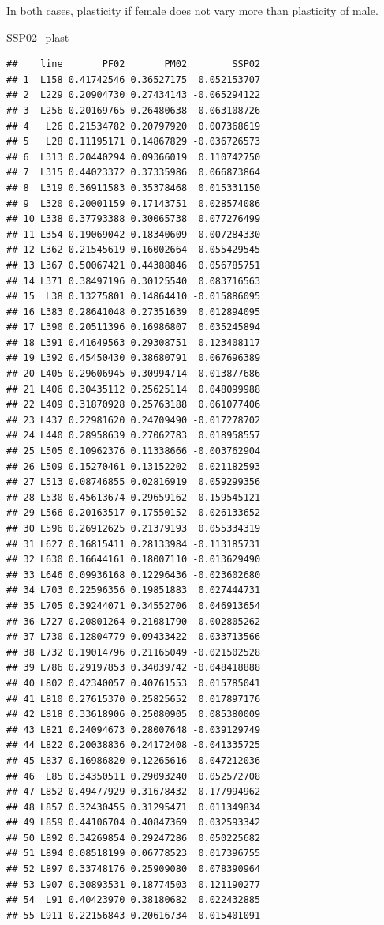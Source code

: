 \documentclass[
]{article}
\newenvironment{Shaded}{\begin{snugshade}}{\end{snugshade}}
\newcommand{\NormalTok}[1]{#1}
\begin{document}
In both cases, plasticity if female does not vary more than plasticity
of male.

\begin{Shaded}
\begin{Highlighting}[]
\NormalTok{SSP02_plast}
\end{Highlighting}
\end{Shaded}

\begin{verbatim}
##    line       PF02       PM02        SSP02
## 1  L158 0.41742546 0.36527175  0.052153707
## 2  L229 0.20904730 0.27434143 -0.065294122
## 3  L256 0.20169765 0.26480638 -0.063108726
## 4   L26 0.21534782 0.20797920  0.007368619
## 5   L28 0.11195171 0.14867829 -0.036726573
## 6  L313 0.20440294 0.09366019  0.110742750
## 7  L315 0.44023372 0.37335986  0.066873864
## 8  L319 0.36911583 0.35378468  0.015331150
## 9  L320 0.20001159 0.17143751  0.028574086
## 10 L338 0.37793388 0.30065738  0.077276499
## 11 L354 0.19069042 0.18340609  0.007284330
## 12 L362 0.21545619 0.16002664  0.055429545
## 13 L367 0.50067421 0.44388846  0.056785751
## 14 L371 0.38497196 0.30125540  0.083716563
## 15  L38 0.13275801 0.14864410 -0.015886095
## 16 L383 0.28641048 0.27351639  0.012894095
## 17 L390 0.20511396 0.16986807  0.035245894
## 18 L391 0.41649563 0.29308751  0.123408117
## 19 L392 0.45450430 0.38680791  0.067696389
## 20 L405 0.29606945 0.30994714 -0.013877686
## 21 L406 0.30435112 0.25625114  0.048099988
## 22 L409 0.31870928 0.25763188  0.061077406
## 23 L437 0.22981620 0.24709490 -0.017278702
## 24 L440 0.28958639 0.27062783  0.018958557
## 25 L505 0.10962376 0.11338666 -0.003762904
## 26 L509 0.15270461 0.13152202  0.021182593
## 27 L513 0.08746855 0.02816919  0.059299356
## 28 L530 0.45613674 0.29659162  0.159545121
## 29 L566 0.20163517 0.17550152  0.026133652
## 30 L596 0.26912625 0.21379193  0.055334319
## 31 L627 0.16815411 0.28133984 -0.113185731
## 32 L630 0.16644161 0.18007110 -0.013629490
## 33 L646 0.09936168 0.12296436 -0.023602680
## 34 L703 0.22596356 0.19851883  0.027444731
## 35 L705 0.39244071 0.34552706  0.046913654
## 36 L727 0.20801264 0.21081790 -0.002805262
## 37 L730 0.12804779 0.09433422  0.033713566
## 38 L732 0.19014796 0.21165049 -0.021502528
## 39 L786 0.29197853 0.34039742 -0.048418888
## 40 L802 0.42340057 0.40761553  0.015785041
## 41 L810 0.27615370 0.25825652  0.017897176
## 42 L818 0.33618906 0.25080905  0.085380009
## 43 L821 0.24094673 0.28007648 -0.039129749
## 44 L822 0.20038836 0.24172408 -0.041335725
## 45 L837 0.16986820 0.12265616  0.047212036
## 46  L85 0.34350511 0.29093240  0.052572708
## 47 L852 0.49477929 0.31678432  0.177994962
## 48 L857 0.32430455 0.31295471  0.011349834
## 49 L859 0.44106704 0.40847369  0.032593342
## 50 L892 0.34269854 0.29247286  0.050225682
## 51 L894 0.08518199 0.06778523  0.017396755
## 52 L897 0.33748176 0.25909080  0.078390964
## 53 L907 0.30893531 0.18774503  0.121190277
## 54  L91 0.40423970 0.38180682  0.022432885
## 55 L911 0.22156843 0.20616734  0.015401091
\end{verbatim}
\end{document}

